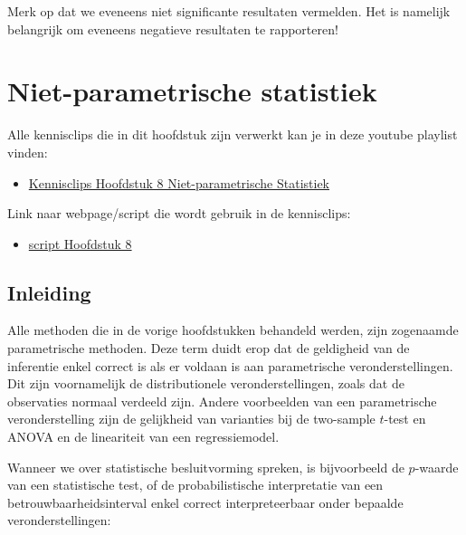 \documentclass[
  dutch,
  letterpaper,
  12pt]{book}
\providecommand{\tightlist}{%
  \setlength{\itemsep}{0pt}\setlength{\parskip}{0pt}}
\theoremstyle{definition}
\theoremstyle{definition}
\theoremstyle{definition}
\theoremstyle{remark}
\begin{document}
Merk op dat we eveneens niet significante resultaten vermelden. Het is
namelijk belangrijk om eveneens negatieve resultaten te rapporteren!


\chapter{Niet-parametrische
statistiek}\label{niet-parametrische-statistiek}

Alle kennisclips die in dit hoofdstuk zijn verwerkt kan je in deze
youtube playlist vinden:

\begin{itemize}
\tightlist
\item
  \href{https://www.youtube.com/playlist?list=PLZH1hP8_LbJJyR4mqLOxDwwOzysbhaFm1}{Kennisclips
  Hoofdstuk 8 Niet-parametrische Statistiek}
\end{itemize}

Link naar webpage/script die wordt gebruik in de kennisclips:

\begin{itemize}
\tightlist
\item
  \href{https://statomics.github.io/sbc/rmd/08-NonparametericStatistics.html}{script
  Hoofdstuk 8}
\end{itemize}

\section{Inleiding}\label{inleiding-7}

Alle methoden die in de vorige hoofdstukken behandeld werden, zijn
zogenaamde parametrische methoden. Deze term duidt erop dat de
geldigheid van de inferentie enkel correct is als er voldaan is aan
parametrische veronderstellingen. Dit zijn voornamelijk de
distributionele veronderstellingen, zoals dat de observaties normaal
verdeeld zijn. Andere voorbeelden van een parametrische veronderstelling
zijn de gelijkheid van varianties bij de two-sample \(t\)-test en ANOVA
en de lineariteit van een regressiemodel.

Wanneer we over statistische besluitvorming spreken, is bijvoorbeeld de
\(p\)-waarde van een statistische test, of de probabilistische
interpretatie van een betrouwbaarheidsinterval enkel correct
interpreteerbaar onder bepaalde veronderstellingen:
\end{document}
